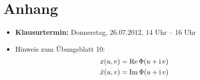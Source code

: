 \chapter*{Anhang}
\begin{itemize}
 \item \textbf{Klausurtermin:} Donnerstag, 26.07.2012, 14 Uhr – 16 Uhr
 \item Hinweis zum Übungsblatt 10:
 \begin{align*}
  x(u,v) &= \operatorname{Re} \Phi(u + \operatorname{i} v) \\
  \hat x(u,v) &= \operatorname{Im} \Phi(u + \operatorname{i} v)
 \end{align*}

\end{itemize}
